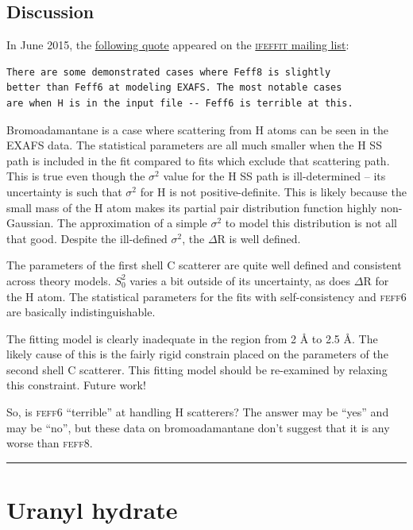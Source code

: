 \documentclass[11pt]{article}
\begin{document}
\subsection{Discussion}
\label{sec:orgheadline36}

In June 2015, the
\href{http://www.mail-archive.com/ifeffit@millenia.cars.aps.anl.gov/msg05040.html}{following
  quote} appeared on the
\href{http://cars9.uchicago.edu/mailman/listinfo/ifeffit/}{\textsc{ifeffit}
  mailing list}:

\begin{verbatim}
There are some demonstrated cases where Feff8 is slightly
better than Feff6 at modeling EXAFS. The most notable cases
are when H is in the input file -- Feff6 is terrible at this.
\end{verbatim}

Bromoadamantane is a case where scattering from H atoms can be seen in
the EXAFS data. The statistical parameters are all much smaller when
the H SS path is included in the fit compared to fits which exclude
that scattering path. This is true even though the $\sigma^2$ value
for the H SS path is ill-determined -- its uncertainty is such that
$\sigma^2$ for H is not positive-definite. This is likely because the
small mass of the H atom makes its partial pair distribution function
highly non-Gaussian. The approximation of a simple $\sigma^2$ to model
this distribution is not all that good. Despite the ill-defined
$\sigma^2$, the $\Delta$R is well defined.

The parameters of the first shell C scatterer are quite well defined and
consistent across theory models. $S_0^2$ varies a bit outside of its
uncertainty, as does $\Delta$R for the H atom. The statistical parameters for
the fits with self-consistency and \textsc{feff6} are basically
indistinguishable.

The fitting model is clearly inadequate in the region from 2 {\AA} to
2.5 {\AA}.  The likely cause of this is the fairly rigid constrain
placed on the parameters of the second shell C scatterer. This fitting
model should be re-examined by relaxing this constraint. Future work!

So, is \textsc{feff6} ``terrible'' at handling H scatterers? The
answer may be ``yes'' and may be ``no'', but these data on
bromoadamantane don't suggest that it is any worse than
\textsc{feff8}.

\rule{\linewidth}{0.5pt}

\section{Uranyl hydrate}
\label{sec:orgheadline43}
\end{document}
